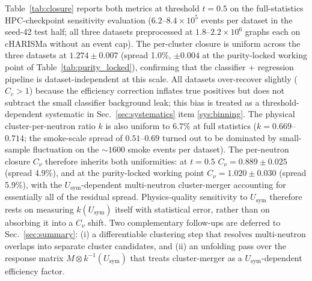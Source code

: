 \documentclass[aps,prc,twocolumn,superscriptaddress,showpacs,%
               nofootinbib,floatfix,longbibliography]{revtex4-2}
\newcommand{\Usym}{U_{\text{sym}}}
\begin{document}
Table~\ref{tab:closure} reports both metrics at threshold $t = 0.5$
on the full-statistics HPC-checkpoint sensitivity evaluation
($6.2$--$8.4 \times 10^{5}$ events per dataset in the seed-42
test half; all three datasets preprocessed at
$1.8$--$2.2 \times 10^{6}$ graphs each on cHARISMa without an
event cap).  The per-cluster closure is uniform across the three
datasets at $1.274 \pm 0.007$ (spread 1.0\%, $\pm 0.004$ at the
purity-locked working point of Table~\ref{tab:purity_locked}),
confirming that the classifier + regression pipeline is
dataset-independent at this scale.  All datasets over-recover
slightly ($C_c > 1$) because the efficiency correction inflates
true positives but does not subtract the small classifier
background leak; this bias is treated as a threshold-dependent
systematic in Sec.~\ref{sec:systematics} item \ref{sys:binning}.
The physical cluster-per-neutron ratio $k$ is also uniform to
$6.7\%$ at full statistics ($k = 0.669$--$0.714$; the smoke-scale
spread of $0.51$--$0.69$ turned out to be dominated by
small-sample fluctuation on the $\sim 1600$ smoke events per
dataset).  The per-neutron closure $C_\nu$ therefore inherits both
uniformities: at $t = 0.5$
$C_\nu = 0.889 \pm 0.025$ (spread 4.9\%), and at the purity-locked
working point $C_\nu = 1.020 \pm 0.030$ (spread 5.9\%), with the
$\Usym$-dependent multi-neutron cluster-merger accounting for
essentially all of the residual spread.  Physics-quality
sensitivity to $\Usym$ therefore rests on measuring
$k(\Usym)$ itself with statistical error, rather than on absorbing
it into a $C_\nu$ shift.  Two complementary follow-ups are deferred
to Sec.~\ref{sec:summary}:
(i) a differentiable clustering step that resolves multi-neutron
overlaps into separate cluster candidates, and
(ii) an unfolding pass over the response matrix
$M \otimes k^{-1}(\Usym)$ that treats cluster-merger as a
$\Usym$-dependent efficiency factor.
\end{document}
